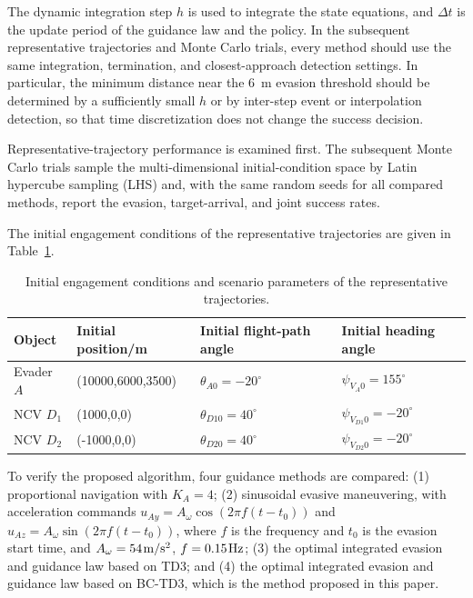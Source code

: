 The dynamic integration step $h$ is used to integrate the state equations, and $\Delta t$ is the update period of the guidance law and the policy. In the subsequent representative trajectories and Monte Carlo trials, every method should use the same integration, termination, and closest-approach detection settings. In particular, the minimum distance near the 6~m evasion threshold should be determined by a sufficiently small $h$ or by inter-step event or interpolation detection, so that time discretization does not change the success decision.

Representative-trajectory performance is examined first. The subsequent Monte Carlo trials sample the multi-dimensional initial-condition space by Latin hypercube sampling (LHS) and, with the same random seeds for all compared methods, report the evasion, target-arrival, and joint success rates.

The initial engagement conditions of the representative trajectories are given in Table~\ref{tab:init-traj}.

\begin{table}[H]
\centering
\caption{Initial engagement conditions and scenario parameters of the representative trajectories.}
\label{tab:init-traj}
\small
\begin{tabularx}{\linewidth}{lXXX}
\toprule
Object & Initial position/m & Initial flight-path angle & Initial heading angle \\
\midrule
Evader $A$ & (10000,6000,3500) & ${\theta _{A0}} =  - {20^ \circ }$ & ${\psi _{{V_A}0}} = {155^ \circ }$ \\
NCV ${D_1}$ & (1000,0,0) & ${\theta _{D10}} = {40^ \circ }$ & ${\psi _{{V_{D1}}0}} =  - {20^ \circ }$ \\
NCV ${D_2}$ & (-1000,0,0) & ${\theta _{D20}} = {40^ \circ }$ & ${\psi _{{V_{D2}}0}} =  - {20^ \circ }$ \\
\bottomrule
\end{tabularx}
\end{table}
To verify the proposed algorithm, four guidance methods are compared: (1) proportional navigation with ${K_A} = 4$; (2) sinusoidal evasive maneuvering, with acceleration commands ${u_{Ay}} = {A_\omega }\cos (2\pi f(t - {t_0}))$ and ${u_{Az}} = {A_\omega }\sin (2\pi f(t - {t_0}))$, where $f$ is the frequency and ${t_0}$ is the evasion start time, and ${A_\omega } = 54{\kern 1pt}\mathrm{m/s^2}$, $f = 0.15{\kern 1pt}\mathrm{Hz}$; (3) the optimal integrated evasion and guidance law based on TD3; and (4) the optimal integrated evasion and guidance law based on BC-TD3, which is the method proposed in this paper.

